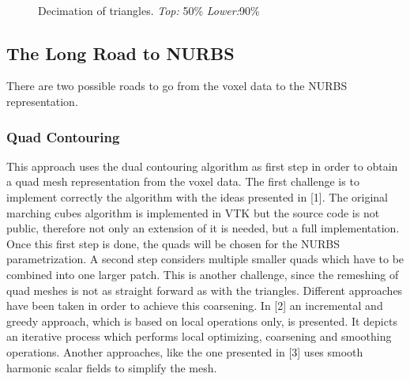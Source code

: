 \begin{figure}
\centering
   \\
   \caption{Decimation of triangles. \textit{Top:} 50\% \textit{Lower:}90\%}
\end{figure}

\subsection{The Long Road to NURBS}
There are two possible roads to go from the voxel data to the NURBS representation.
\subsubsection{Quad Contouring}
This approach uses the dual contouring algorithm as first step in order to obtain a quad mesh
representation from the voxel data. The first challenge is to implement correctly the algorithm
with the ideas presented in [1]. The original marching cubes algorithm is
implemented in VTK but the source code is not public, therefore not only an extension
of it is needed, but a full implementation. Once this first step is done, the quads will be chosen for the
NURBS parametrization. A second step considers multiple smaller quads which have to be
combined into one larger patch. This is another challenge, since the remeshing of quad meshes
is not as straight forward as with the triangles. Different approaches have been taken in order to
achieve this coarsening. In [2] an incremental and greedy approach, which is based on local operations only, is presented. It depicts an iterative process which performs local optimizing, coarsening and smoothing operations. Another approaches, like
the one presented in [3] uses smooth harmonic scalar fields to simplify the mesh.


